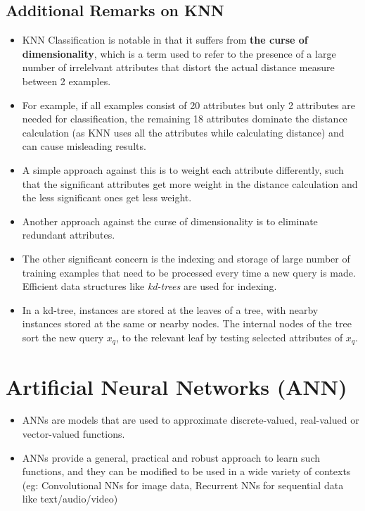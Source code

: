 \documentclass{article}
\theoremstyle{plain}
\theoremstyle{definition}
\begin{document}
\subsection{Additional Remarks on KNN}
\begin{itemize}
    \item KNN Classification is notable in that it suffers from \textbf{the curse of dimensionality}, which is a term used to refer to the presence of a large number of irrelelvant attributes that distort the actual distance measure between 2 examples.
    
    \item For example, if all examples consist of 20 attributes but only 2 attributes are needed for classification, the remaining 18 attributes dominate the distance calculation (as KNN uses all the attributes while calculating distance) and can cause misleading results. 
    
    \item A simple approach against this is to weight each attribute differently, such that the significant attributes get more weight in the distance calculation and the less significant ones get less weight. 
    
    \item Another approach against the curse of dimensionality is to eliminate redundant attributes.
    
    \item The other significant concern is the indexing and storage of large number of training examples that need to be processed every time a new query is made. Efficient data structures like \textit{kd-trees} are used for indexing. 
    
    \item In a kd-tree, instances are stored at the leaves of a tree, with nearby instances stored at the same or nearby nodes. The internal nodes of the tree sort the new query $x_q$, to the relevant leaf by testing selected attributes of $x_q$.
\end{itemize}

\section{Artificial Neural Networks (ANN)}
\begin{itemize}
    \item ANNs are models that are used to approximate discrete-valued, real-valued or vector-valued functions. 
    
    \item ANNs provide a general, practical and robust approach to learn such functions, and they can be modified to be used in a wide variety of contexts
    (eg: Convolutional NNs for image data, Recurrent NNs for sequential data like text/audio/video) 
\end{itemize}
\end{document}
